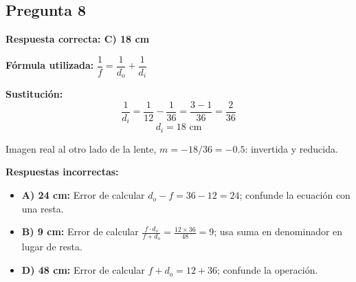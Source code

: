 \begin{respuestabox}
\subsection*{Pregunta 8}
\textcolor{verdecorrecto}{\textbf{Respuesta correcta: C) 18 cm}}

\textbf{Fórmula utilizada:} $\dfrac{1}{f} = \dfrac{1}{d_o} + \dfrac{1}{d_i}$

\textbf{Sustitución:}
$$\frac{1}{d_i} = \frac{1}{12} - \frac{1}{36} = \frac{3-1}{36} = \frac{2}{36}$$
$$d_i = 18 \text{ cm}$$

Imagen real al otro lado de la lente, $m = -18/36 = -0.5$: invertida y reducida.

\textbf{Respuestas incorrectas:}
\begin{itemize}
    \item \textbf{A) 24 cm:} Error de calcular $d_o - f = 36 - 12 = 24$; confunde la ecuación con una resta.
    \item \textbf{B) 9 cm:} Error de calcular $\frac{f \cdot d_o}{f + d_o} = \frac{12 \times 36}{48} = 9$; usa suma en denominador en lugar de resta.
    \item \textbf{D) 48 cm:} Error de calcular $f + d_o = 12 + 36$; confunde la operación.
\end{itemize}
\end{respuestabox}

